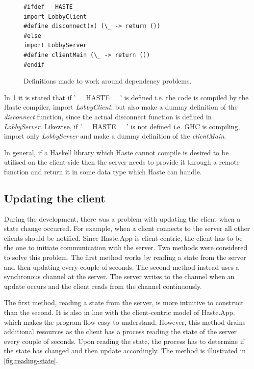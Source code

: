 \documentclass[a4paper]{article}
\begin{document}
\begin{figure}[ht!]
\begin{lstlisting}
#ifdef __HASTE__
import LobbyClient
#define disconnect(x) (\_ -> return ())
#else
import LobbyServer
#define clientMain (\_ -> return ())
#endif
\end{lstlisting}
\caption{Definitions made to work around dependency problems.}
\label{fig:dependencies-definitions}
\end{figure}

In \cref{fig:dependencies-definitions} it is stated that if '\_\_HASTE\_\_' is defined i.e. the code is compiled by the Haste compiler, import \textit{LobbyClient}, but also make a dummy definition of the \textit{disconnect} function, since the actual disconnect function is defined in \textit{LobbyServer}. Likewise, if '\_\_HASTE\_\_' is not defined i.e. GHC is compiling, import only \textit{LobbyServer} and make a dummy definition of the \textit{clientMain}.

In general, if a Haskell library which Haste cannot compile is desired to be utilised on the client-side then the server needs to provide it through a remote function and return it in some data type which Haste can handle.

\subsection{Updating the client}
\label{sub:updating-client}
During the development, there was a problem with updating the client when a state change occurred. For example, when a client connects to the server all other clients should be notified. Since Haste.App is client-centric, the client has to be the one to initiate communication with the server. Two methods were considered to solve this problem. The first method works by reading a state from the server and then updating every couple of seconds. The second method instead uses a synchronous channel at the server. The server writes to the channel when an update occurs and the client reads from the channel continuously.

The first method, reading a state from the server, is more intuitive to construct than the second. It is also in line with the client-centric model of Haste.App, which makes the program flow easy to understand. However, this method drains additional resources as the client has a process reading the state of the server every couple of seconds. Upon reading the state, the process has to determine if the state has changed and then update accordingly. The method is illustrated in \cref{fig:reading-state}.
\end{document}
